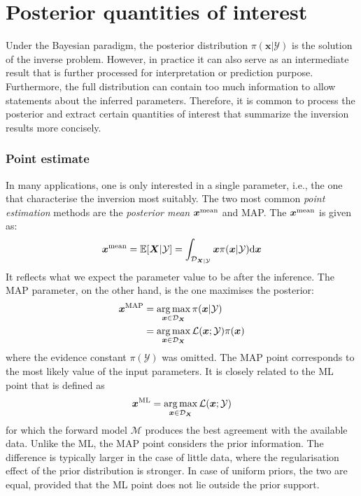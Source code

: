\section{Posterior quantities of interest}
Under the Bayesian paradigm, the posterior distribution $\pi(\boldsymbol{x}|\mathcal{Y})$ is the solution of the inverse problem. However, in practice it can also serve as an intermediate result that is further processed for interpretation or prediction purpose. Furthermore, the full distribution can contain too much information to allow statements about the inferred parameters. Therefore, it is common to process the posterior and extract certain quantities of interest that summarize the inversion results more concisely.

\subsubsection{Point estimate}

In many applications, one is only interested in a single parameter, i.e., the one that characterise the inversion most suitably. The two most common \textit{point estimation} methods are the \textit{posterior mean} $\boldsymbol{x}^{\rm{mean}}$ and \acrfull{MAP}. The $\boldsymbol{x}^{\rm{mean}}$ is given as:
\begin{equation}
    \label{eq: posterior mean}
    \boldsymbol{x}^{\rm{mean}} = \mathbb{E}[\boldsymbol{X}|\mathcal{Y}] = \int_{\mathcal{D}_{\boldsymbol{X}|\mathcal{Y}}} 
    \boldsymbol{x} \pi(\boldsymbol{x}|\mathcal{Y}) {\rm{d}} \boldsymbol{x}  
\end{equation}
It reflects what we expect the parameter value to be after the inference. The \acrshort{MAP} parameter, on the other hand, is the one maximises the posterior:
\begin{equation}
    \label{eq: MAP}
    \begin{aligned}
       \boldsymbol{x}^{\rm{MAP}} &= \mathop{\arg\max}\limits_{\boldsymbol{x} \in \mathcal{D}_{\boldsymbol{X}}}
    \pi(\boldsymbol{x}|\mathcal{Y}) \\
    &=\mathop{\arg\max}\limits_{\boldsymbol{x} \in \mathcal{D}_{\boldsymbol{X}}}
   {\mathcal{L}(\boldsymbol{x};\mathcal{Y}) \pi(\boldsymbol{x})}     
    \end{aligned}
\end{equation}
where the evidence constant $\pi(\mathcal{Y})$ was omitted. The \acrshort{MAP} point corresponds to the most likely value of the input parameters. It is closely related to the \acrfull{ML} point that is defined as 
\begin{equation}
    \label{eq: MLE}
    \boldsymbol{x}^{\rm{ML}}  = \mathop{\arg\max}\limits_{\boldsymbol{x} \in \mathcal{D}_{\boldsymbol{X}}}
   {\mathcal{L}(\boldsymbol{x};\mathcal{Y})}
\end{equation}
for which the forward model $\mathcal{M}$ produces the best agreement with the available data. Unlike the \acrshort{ML}, the \acrshort{MAP} point considers the prior information. The difference is typically larger in the case of little data, where the regularisation effect of the prior distribution is stronger. In case of uniform priors, the two are equal, provided that the \acrshort{ML} point does not lie outside the prior support.

